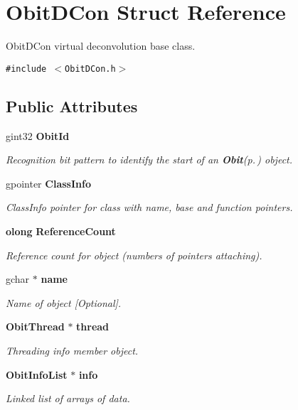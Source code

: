 \section{Obit\-DCon Struct Reference}
\label{structObitDCon}
Obit\-DCon virtual deconvolution base class.  


{\tt \#include $<$Obit\-DCon.h$>$}

\subsection*{Public Attributes}
\begin{CompactItemize}
\item 
gint32 {\bf Obit\-Id}
\begin{CompactList}\small\item\em Recognition bit pattern to identify the start of an {\bf Obit}{\rm (p.\,\pageref{structObit})} object. \item\end{CompactList}\item 
gpointer {\bf Class\-Info}
\begin{CompactList}\small\item\em Class\-Info pointer for class with name, base and function pointers. \item\end{CompactList}\item 
{\bf olong} {\bf Reference\-Count}
\begin{CompactList}\small\item\em Reference count for object (numbers of pointers attaching). \item\end{CompactList}\item 
gchar $\ast$ {\bf name}
\begin{CompactList}\small\item\em Name of object [Optional]. \item\end{CompactList}\item 
{\bf Obit\-Thread} $\ast$ {\bf thread}
\begin{CompactList}\small\item\em Threading info member object. \item\end{CompactList}\item 
{\bf Obit\-Info\-List} $\ast$ {\bf info}
\begin{CompactList}\small\item\em Linked list of arrays of data. \item\end{CompactList}\item 

\end{CompactItemize}
